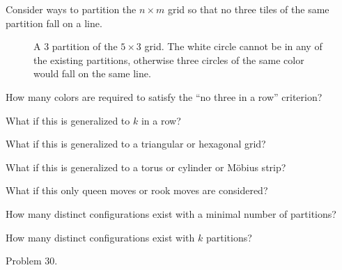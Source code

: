 \documentclass{article}
\begin{document}
  Consider ways to partition the $n \times m$ grid so that no three tiles of the
  same partition fall on a line.
  \begin{figure}[!h]
    \centering
    \caption{
      A $3$ partition of the $5 \times 3$ grid. The white circle cannot be in
      any of the existing partitions, otherwise three circles of the same
      color would fall on the same line.
    }
  \end{figure}

\begin{question}
  How many colors are required to satisfy the ``no three in a row'' criterion?
\end{question}
\begin{related}
  \item What if this is generalized to $k$ in a row?
  \item What if this is generalized to a triangular or hexagonal grid?
  \item What if this is generalized to a torus or cylinder or M\"obius strip?
  \item What if this only queen moves or rook moves are considered?
  \item How many distinct configurations exist with a minimal number of partitions?
  \item How many distinct configurations exist with $k$ partitions?
\end{related}
\begin{references}
  \item Problem 30.
\end{references}
\end{document}
